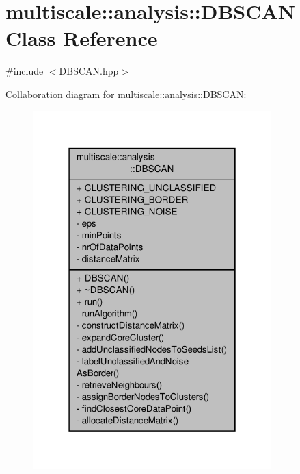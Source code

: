 \hypertarget{classmultiscale_1_1analysis_1_1DBSCAN}{\section{multiscale\-:\-:analysis\-:\-:D\-B\-S\-C\-A\-N Class Reference}
\label{classmultiscale_1_1analysis_1_1DBSCAN}
}


{\ttfamily \#include $<$D\-B\-S\-C\-A\-N.\-hpp$>$}



Collaboration diagram for multiscale\-:\-:analysis\-:\-:D\-B\-S\-C\-A\-N\-:
\nopagebreak
\begin{figure}[H]
\begin{center}
\leavevmode
\includegraphics[width=262pt]{classmultiscale_1_1analysis_1_1DBSCAN__coll__graph}
\end{center}
\end{figure}
